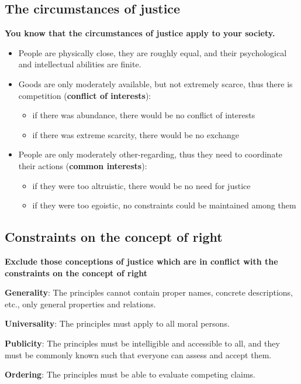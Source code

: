\subsection{The circumstances of justice}

\textbf{You know that the circumstances of justice apply to your society.}

\begin{itemize}
	\item People are physically close, they are roughly equal, and their
	psychological and intellectual abilities are finite.
	\item Goods are only moderately available, but not extremely scarce,
	thus there is competition (\textbf{conflict of interests}):
	\begin{itemize}
		\item if there was abundance, there would be no conflict of
		interests
		\item if there was extreme scarcity, there would be no exchange
	\end{itemize}
	\item People are only moderately other-regarding, thus they need to
	coordinate their actions (\textbf{common interests}):
	\begin{itemize}
		\item if they were too altruistic, there would be no need for
		justice
		\item if they were too egoistic, no constraints could be
		maintained among them
	\end{itemize}
\end{itemize}

\subsection{Constraints on the concept of right}

\textbf{Exclude those conceptions of justice which are in conflict with the
constraints on the concept of right}

\textbf{Generality}: The principles cannot contain proper names, concrete
descriptions, etc., only general properties and relations.

\textbf{Universality}: The principles must apply to all moral persons.

\textbf{Publicity}: The principles must be intelligible and accessible to all,
and they must be commonly known such that everyone can assess and accept them.

\textbf{Ordering}: The principles must be able to evaluate competing claims.

